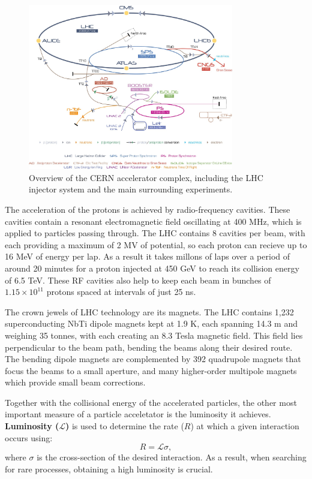 \begin{figure}[h!]
    \centering
    \includegraphics[width=0.8\textwidth]{Figures/2/cern_complex.png}
    \caption{Overview of the CERN accelerator complex, including the LHC injector system and the main surrounding experiments. \cite{cern_acc}}
    \label{fig:lhc_injector}
\end{figure}

The acceleration of the protons is achieved by radio-frequency cavities. These cavities contain a resonant electromagnetic field oscillating at 400 MHz, which is applied to particles passing through. The LHC contains 8 cavities per beam, with each providing a maximum of 2 MV of potential, so each proton can recieve up to 16 MeV of energy per lap. As a result it takes millons of laps over a period of around 20 minutes for a proton injected at 450 GeV to reach its collision energy of 6.5 TeV.  These RF cavities also help to keep each beam in bunches of $1.15 \times 10^{11}$ protons spaced at intervals of just 25 ns.

The crown jewels of LHC technology are its magnets. The LHC contains 1,232 superconducting NbTi dipole magnets kept at 1.9 K, each spanning 14.3 m and weighing 35 tonnes, with each creating an 8.3 Tesla magnetic field. This field lies perpendicular to the beam path, bending the beams along their desired route. The bending dipole magnets are complemented by 392 quadrupole magnets that focus the beams to a small aperture, and many higher-order multipole magnets which provide small beam corrections.

Together with the collisional energy of the accelerated particles, the other most important measure of a particle acceletator is the luminosity it achieves. \textbf{Luminosity ($\mathcal{L}$)} is used to determine the rate ($R$) at which a given interaction occurs using:
\begin{equation}
R = \mathcal{L}\sigma,
\end{equation}
where $\sigma$ is the cross-section of the desired interaction. As a result, when searching for rare processes, obtaining a high luminosity is crucial.

